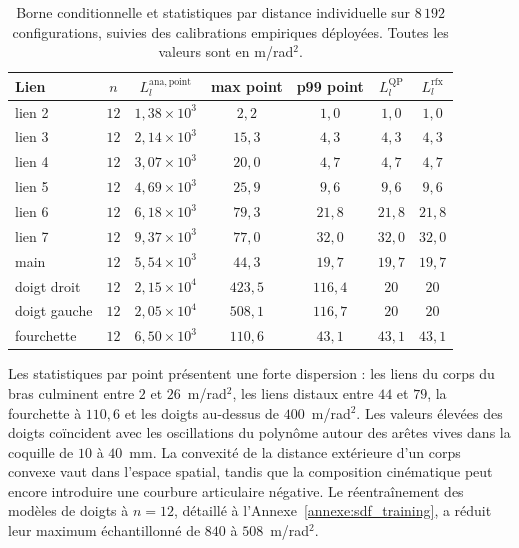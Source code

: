 \begin{table}[htbp]
\centering
\caption[Borne conditionnelle et calibrations par distance]{Borne conditionnelle et statistiques par distance individuelle sur $8\,192$ configurations, suivies des calibrations empiriques déployées. Toutes les valeurs sont en m/rad$^2$.}
\label{tab:lipschitz_links}
\begin{tabular}{lcccccc}
\hline
Lien & $n$ & $L_l^{\mathrm{ana,point}}$ & max point & p99 point & $L_l^{\mathrm{QP}}$ & $L_l^{\mathrm{rfx}}$ \\ \hline
lien 2        & $12$ & $1{,}38\times10^{3}$ & $2{,}2$   & $1{,}0$   & $1{,}0$ & $1{,}0$ \\
lien 3        & $12$ & $2{,}14\times10^{3}$ & $15{,}3$  & $4{,}3$   & $4{,}3$ & $4{,}3$ \\
lien 4        & $12$ & $3{,}07\times10^{3}$ & $20{,}0$  & $4{,}7$   & $4{,}7$ & $4{,}7$ \\
lien 5        & $12$ & $4{,}69\times10^{3}$ & $25{,}9$  & $9{,}6$   & $9{,}6$ & $9{,}6$ \\
lien 6        & $12$ & $6{,}18\times10^{3}$ & $79{,}3$  & $21{,}8$  & $21{,}8$ & $21{,}8$ \\
lien 7        & $12$ & $9{,}37\times10^{3}$ & $77{,}0$  & $32{,}0$  & $32{,}0$ & $32{,}0$ \\
main          & $12$ & $5{,}54\times10^{3}$ & $44{,}3$  & $19{,}7$  & $19{,}7$ & $19{,}7$ \\
doigt droit   & $12$ & $2{,}15\times10^{4}$ & $423{,}5$ & $116{,}4$ & $20$ & $20$ \\
doigt gauche  & $12$ & $2{,}05\times10^{4}$ & $508{,}1$ & $116{,}7$ & $20$ & $20$ \\
fourchette    & $12$ & $6{,}50\times10^{3}$ & $110{,}6$ & $43{,}1$  & $43{,}1$ & $43{,}1$ \\
\hline
\end{tabular}
\end{table}

Les statistiques par point présentent une forte dispersion : les liens du corps du bras culminent entre $2$ et $26$~m/rad$^2$, les liens distaux entre $44$ et $79$, la fourchette à $110{,}6$ et les doigts au-dessus de $400$~m/rad$^2$. Les valeurs élevées des doigts coïncident avec les oscillations du polynôme autour des arêtes vives dans la coquille de $10$ à $40$~mm. La convexité de la distance extérieure d'un corps convexe vaut dans l'espace spatial, tandis que la composition cinématique peut encore introduire une courbure articulaire négative. Le réentraînement des modèles de doigts à $n=12$, détaillé à l'Annexe~\ref{annexe:sdf_training}, a réduit leur maximum échantillonné de $840$ à $508$~m/rad$^2$.

